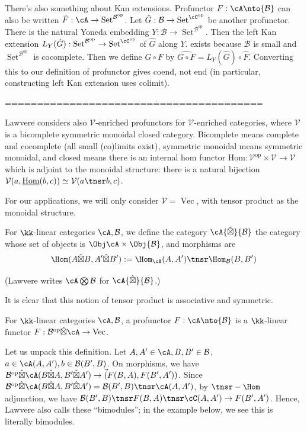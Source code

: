\documentclass[12pt]{article}
\newcommand{\op}{{\text{op}}}
\newcommand{\cB}{{\mathcal{B}}}
\newcommand{\cV}{{\mathcal{V}}}
\newcommand{\hatbox}{{\hat{\boxtimes}}}
\DeclareMathOperator{\Set}{Set}
\DeclareMathOperator{\Vect}{Vec}
\newcommand{\ihom}{{\underline{\textrm{Hom}}}}
\begin{document}
There's also something about Kan extensions.
Profunctor $F: \cA \nto \cB$ can also be written
$\hat{F}: \cA \to \Set^{\cB^\op}$.
Let $\hat{G}: \cB \to \Set^{\cC^\op}$ be another profunctor.
There is the natural Yoneda embedding $Y:\cB \to \Set^{\cB^\op}$.
Then the left Kan extension
$L_{Y}(\hat{G}): \Set^{\cB^\op} \to \Set^{\cC^\op}$
of $\hat{G}$ along $Y$.
exists because $\cB$ is small and $\Set^{\cB^\op}$
is cocomplete.
Then we define $G\circ F$ by
$\widehat{G\circ F} = L_{Y}(\hat{G}) \circ \hat{F}$.
Converting this to our definition of profunctor
gives coend, not end
(in particular, constructing left Kan extension uses colimit).



========================================

Lawvere considers also $\cV$-enriched profunctors
for $\cV$-enriched categories,
where $\cV$ is a
bicomplete symmetric monoidal closed category.
Bicomplete means complete and cocomplete
(all small (co)limits exist),
symmetric monoidal means symmetric monoidal,
and closed means there is an internal hom functor
$\ihom: \cV^\op \times \cV \to \cV$
which is adjoint to the monoidal structure:
there is a natural bijection
$\cV(a,\ihom(b,c)) \simeq \cV(a \tnsr b, c)$.

For our applications, we will only consider $\cV = \Vect$,
with tensor product as the monoidal structure.

\begin{definition}
For $\kk$-linear categories $\cA,\cB$,
we define the category $\cA \hatbox \cB$ the category
whose set of objects is $\Obj \cA \times \Obj \cB$,
and morphisms are
\[
\Hom(A \hatbox B, A' \hatbox B')
:=
\Hom_\cA(A, A') \tnsr \Hom_\cB(B, B')
\]
\end{definition}

(Lawvere \cite{Lawvere} writes $\cA \bigotimes \cB$
for $\cA \hatbox \cB$.)

It is clear that
this notion of tensor product is associative and symmetric.

\begin{definition}
For $\kk$-linear categories $\cA,\cB$,
a profunctor $F: \cA \nto \cB$ is a $\kk$-linear functor
$F: \cB^\op \hatbox \cA \to \Vect$.
\end{definition}

Let us unpack this definition.
Let $A,A' \in \cA, B,B' \in \cB$,
$a \in \cA(A,A'), b \in \cB(B',B)$.
On morphisms, we have
$\cB^\op \hatbox \cA (B \hatbox A, B' \hatbox A')
\to \Vec(F(B,A), F(B',A'))$.
Since $\cB^\op \hatbox \cA (B \hatbox A, B' \hatbox A')
= \cB(B',B) \tnsr \cA(A,A')$,
by $\tnsr-\Hom$ adjunction,
we have
$\cB(B',B) \tnsr F(B,A) \tnsr \cC(A,A') \to F(B',A')$.
Hence, Lawvere \cite{Lawvere} also calls these
``bimodules'';
in the example below, we see this is literally bimodules.
\end{document}
